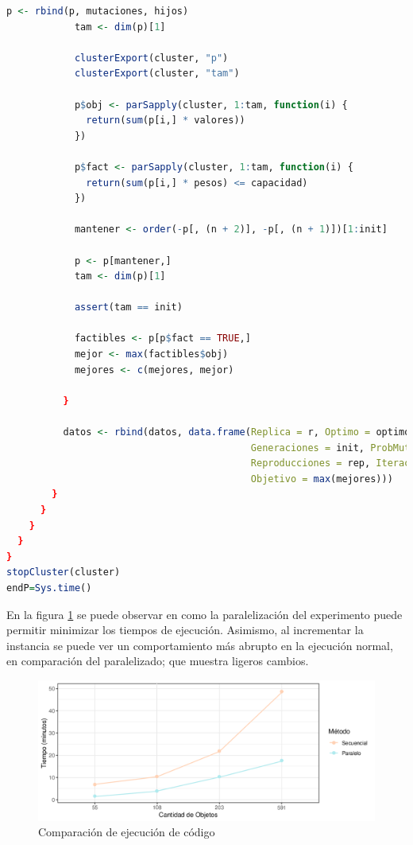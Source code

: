 \documentclass[12pt, letterpaper] {article}
\begin{document}
\begin{lstlisting}[language=R]
            p <- rbind(p, mutaciones, hijos)
            tam <- dim(p)[1]
            
            clusterExport(cluster, "p")
            clusterExport(cluster, "tam")
            
            p$obj <- parSapply(cluster, 1:tam, function(i) {
              return(sum(p[i,] * valores))
            })
            
            p$fact <- parSapply(cluster, 1:tam, function(i) {
              return(sum(p[i,] * pesos) <= capacidad)
            })
            
            mantener <- order(-p[, (n + 2)], -p[, (n + 1)])[1:init]
            
            p <- p[mantener,]
            tam <- dim(p)[1]
            
            assert(tam == init)
            
            factibles <- p[p$fact == TRUE,]
            mejor <- max(factibles$obj)
            mejores <- c(mejores, mejor)
            
          }
          
          datos <- rbind(datos, data.frame(Replica = r, Optimo = optimo,
                                           Generaciones = init, ProbMut = pm,
                                           Reproducciones = rep, Iteraciones = tmax,
                                           Objetivo = max(mejores)))
        }
      }
    }
  }
}
stopCluster(cluster)
endP=Sys.time()
\end{lstlisting}

En la figura \ref{NormPar} se puede observar en como la paralelización del experimento puede permitir minimizar los tiempos de ejecución. Asimismo, al incrementar la instancia se puede ver un comportamiento más abrupto en la ejecución normal, en comparación del paralelizado; que muestra ligeros cambios.

\begin{figure}[H]
\centering\includegraphics[width=170mm]{NormalParalelo.png}
\caption{Comparación de ejecución de código}
\label{NormPar}
\end{figure}
\end{document}
